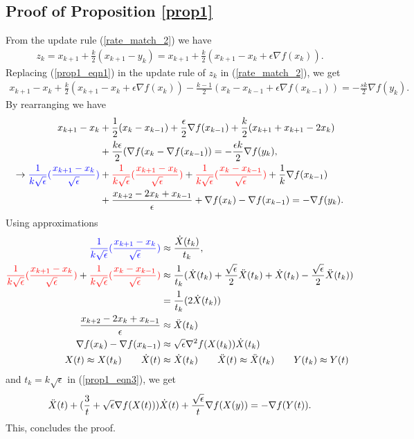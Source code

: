 \documentclass{article}
\theoremstyle{plain}
\theoremstyle{definition}
\theoremstyle{remark}
\begin{document}
    \subsection{Proof of Proposition \ref{prop1}}
    From the update rule (\ref{rate_match_2}) we have
    \begin{align}\label{prop1_eqn1}
        z_k = x_{k+1}+\frac{k}{2}(x_{k+1}-y_k)=x_{k+1}+\frac{k}{2}(x_{k+1}-x_k+\epsilon \nabla f(x_k)).
    \end{align}
    Replacing (\ref{prop1_eqn1}) in the update rule of $z_k$ in (\ref{rate_match_2}), we get
    \begin{align}\label{prop1_eqn2}
        x_{k+1}-x_k+\frac{k}{2}(x_{k+1}-x_k+\epsilon\nabla f(x_k))-\frac{k-1}{2}(x_k-x_{k-1}+\epsilon \nabla f(x_{k-1}))=-\frac{sk}{2}\nabla f(y_k).
    \end{align}
    By rearranging we have
      \begin{align}\label{prop1_eqn3}
        x_{k+1}-x_k&+\frac{1}{2}(x_{k}-x_{k-1})+\frac{\epsilon}{2}\nabla f(x_{k-1})+\frac{k}{2}(x_{k+1}+x_{k+1}-2x_k)\nonumber\\
        &+\frac{k\epsilon}{2}(\nabla f(x_{k}- \nabla f(x_{k-1}))=-\frac{\epsilon k}{2}\nabla f(y_k),\nonumber\\
        \rightarrow \color{blue}\frac{1}{k\sqrt{\epsilon}}(\frac{x_{k+1}-x_k}{\sqrt{\epsilon}})\color{black}&+\color{red}\frac{1}{k\sqrt{\epsilon}}(\frac{x_{k+1}-x_k}{\sqrt{\epsilon}})\color{black}+\color{red}\frac{1}{k\sqrt{\epsilon}}(\frac{x_k-x_{k-1}}{\sqrt{\epsilon}})\color{black} +\frac{1}{k}\nabla f(x_{k-1}) \nonumber\\
        & +\frac{x_{k+2}-2x_k+x_{k-1}}{\epsilon}+\nabla f(x_k)-\nabla f(x_{k-1})=-\nabla f(y_k).
    \end{align}
    Using approximations
    \begin{align}\label{prop1_eqn4}
        \color{blue}\frac{1}{k\sqrt{\epsilon}}(\frac{x_{k+1}-x_k}{\sqrt{\epsilon}})&\approx \frac{\dot X(t_k)}{t_k},\\
        \color{red}\frac{1}{k\sqrt{\epsilon}}(\frac{x_{k+1}-x_k}{\sqrt{\epsilon}})\color{black}+\color{red}\frac{1}{k\sqrt{\epsilon}}(\frac{x_k-x_{k-1}}{\sqrt{\epsilon}})&\approx \frac{1}{t_k}(\dot X(t_k)+\frac{\sqrt{\epsilon}}{2}\Ddot{X}(t_k)+ \dot X(t_k)-\frac{\sqrt{\epsilon}}{2}\Ddot{X}(t_k))\nonumber\\
        &=\frac{1}{t_k}(2 \dot X(t_k))\\
        \frac{x_{k+2}-2x_k+x_{k-1}}{\epsilon}&\approx \Ddot{X}(t_k)\\
        \nabla f(x_k)-\nabla f(x_{k-1})&\approx \sqrt{\epsilon}\nabla^2 f(X(t_k))\dot X(t_k)\\
        X(t)\approx X(t_k)\qquad \dot X(t)&\approx\dot X(t_k)\qquad \Ddot X(t)\approx\Ddot X(t_k) \qquad Y(t_k)\approx Y(t)
    \end{align}
    and $t_k=k\sqrt{\epsilon}$ in (\ref{prop1_eqn3}), we get
\begin{align}\label{prop1_eqn5}
    \Ddot{X}(t)+(\frac{3}{t}+\sqrt{\epsilon}\nabla f(X(t)))\dot X(t)+\frac{\sqrt{\epsilon}}{t}\nabla f(X(y))=-\nabla f(Y(t)).
\end{align}
This, concludes the proof.
\end{document}
